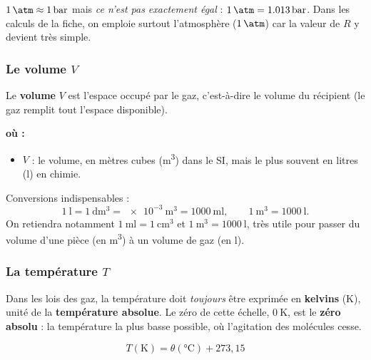 \documentclass[11pt,a4paper]{article}
\newenvironment{ou}{%
  \par\smallskip\noindent\textbf{où :}\nopagebreak
  \begin{itemize}[leftmargin=1.8em,topsep=2pt,itemsep=1.5pt,parsep=0pt]}%
  {\end{itemize}}
\begin{document}
\begin{attention}
$\qty{1}{\atm}\approx\qty{1}{\bar}$ mais \emph{ce n'est pas exactement égal} :
$\qty{1}{\atm}=\qty{1{,}013}{\bar}$. Dans les calculs de la fiche, on emploie surtout l'atmosphère
($\qty{1}{\atm}$) car la valeur de $R$ y devient très simple.
\end{attention}

\subsubsection{Le volume \texorpdfstring{$V$}{V}}

\begin{definition}[volume]
Le \textbf{volume} $V$ est l'espace occupé par le gaz, c'est-à-dire le volume du récipient (le gaz
remplit tout l'espace disponible).
\end{definition}

\begin{ou}
  \item $V$ : le volume, en mètres cubes (\si{\meter\cubed}) dans le SI, mais le plus souvent en
        litres (\si{\litre}) en chimie.
\end{ou}

\noindent Conversions indispensables :
\[ \qty{1}{\litre}=\qty{1}{\deci\meter\cubed}=\qty{e-3}{\meter\cubed}=\qty{1000}{\milli\litre},
   \qquad \qty{1}{\meter\cubed}=\qty{1000}{\litre}. \]
On retiendra notamment $\qty{1}{\milli\litre}=\qty{1}{\centi\meter\cubed}$ et
$\qty{1}{\meter\cubed}=\qty{1000}{\litre}$, très utile pour passer du volume d'une pièce (en \si{\meter\cubed})
à un volume de gaz (en \si{\litre}).

\subsubsection{La température \texorpdfstring{$T$}{T}}

\begin{definition}
Dans les lois des gaz, la température doit \emph{toujours} être exprimée en \textbf{kelvins}
(\si{\kelvin}), unité de la \textbf{température absolue}. Le zéro de cette échelle, $\qty{0}{\kelvin}$,
est le \textbf{zéro absolu} : la température la plus basse possible, où l'agitation des molécules cesse.
\end{definition}

\begin{formule}
\[ \boxed{\,T(\si{\kelvin}) = \theta(\si{\degreeCelsius}) + 273{,}15\,} \]
\end{formule}
\end{document}
